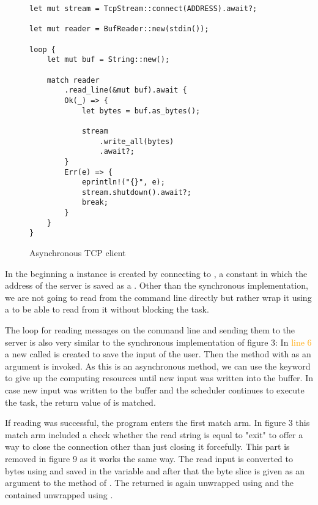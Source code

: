 \begin{figure}[ht]
    \begin{verbatim}
let mut stream = TcpStream::connect(ADDRESS).await?;

let mut reader = BufReader::new(stdin());

loop {
    let mut buf = String::new();

    match reader
        .read_line(&mut buf).await {
        Ok(_) => {
            let bytes = buf.as_bytes();

            stream
                .write_all(bytes)
                .await?;
        }
        Err(e) => {
            eprintln!("{}", e);
            stream.shutdown().await?;
            break;
        }
    }
}
    \end{verbatim}
    \caption{Asynchronous TCP client}
\end{figure}

In the beginning a  instance is created by connecting to , a constant in
which the address of the server is saved as a . Other than the synchronous implementation, we are not going
to read from the command line directly but rather wrap it using a  to be able to read from
it without blocking the task.

The loop for reading messages on the command line and sending them to the server is also very similar to the
synchronous implementation of figure 3: In \textcolor{orange}{line 6} a new  called  is created
to save the input of the user. Then the  method with  as an argument is invoked. As this is
an asynchronous method, we can use the  keyword to give up the computing resources until new input was
written into the buffer. In case new input was written to the buffer and the scheduler continues to execute the task,
the return value of  is matched.

If reading was successful, the program enters the first match arm. In figure 3 this match
arm included a check whether the read string is equal to "exit" to offer a way to close the connection other than just
closing it forcefully. This part is removed in figure 9 as it works the same way. The read input is converted to bytes
using  and saved in the variable  and after that the byte slice is given as an argument to
the  method of . The returned  is again unwrapped using  and the
contained  unwrapped using .

